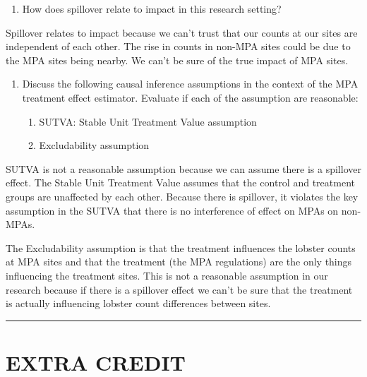 \documentclass[
]{article}
\providecommand{\tightlist}{%
  \setlength{\itemsep}{0pt}\setlength{\parskip}{0pt}}
\begin{document}
\begin{enumerate}
\def\labelenumi{\alph{enumi}.}
\setcounter{enumi}{2}
\tightlist
\item
  How does spillover relate to impact in this research setting?
\end{enumerate}

Spillover relates to impact because we can't trust that our counts at
our sites are independent of each other. The rise in counts in non-MPA
sites could be due to the MPA sites being nearby. We can't be sure of
the true impact of MPA sites.

\begin{enumerate}
\def\labelenumi{\alph{enumi}.}
\setcounter{enumi}{3}
\item
  Discuss the following causal inference assumptions in the context of
  the MPA treatment effect estimator. Evaluate if each of the assumption
  are reasonable:

  \begin{enumerate}
  \def\labelenumii{\arabic{enumii})}
  \tightlist
  \item
    SUTVA: Stable Unit Treatment Value assumption
  \item
    Excludability assumption
  \end{enumerate}
\end{enumerate}

SUTVA is not a reasonable assumption because we can assume there is a
spillover effect. The Stable Unit Treatment Value assumes that the
control and treatment groups are unaffected by each other. Because there
is spillover, it violates the key assumption in the SUTVA that there is
no interference of effect on MPAs on non-MPAs.

The Excludability assumption is that the treatment influences the
lobster counts at MPA sites and that the treatment (the MPA regulations)
are the only things influencing the treatment sites. This is not a
reasonable assumption in our research because if there is a spillover
effect we can't be sure that the treatment is actually influencing
lobster count differences between sites.

\begin{center}\rule{0.5\linewidth}{0.5pt}\end{center}

\section{EXTRA CREDIT}\label{extra-credit}
\end{document}
